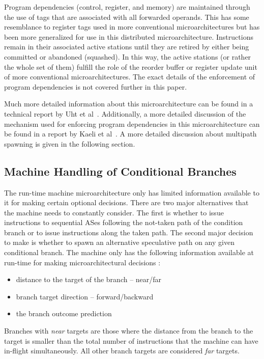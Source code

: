 \documentclass[10pt,dvips]{article}
\begin{document}
Program dependencies (control, register, and memory) are 
maintained through the use of tags that
are associated with all forwarded operands.
This has some resemblance to register tags used in more conventional 
microarchitectures but has been more generalized for use in this
distributed microarchitecture.  Instructions remain in their
associated active stations until they are retired by either being
committed or abandoned (squashed).  In this way, the active stations
(or rather the whole set of them)
fulfill the role of the reorder buffer or register update unit of more
conventional microarchitectures.
The exact details of the enforcement of program dependencies
is not covered further in this paper.

Much more detailed information about this microarchitecture
can be found in a technical report by Uht et al~\cite{Uht01}.
Additionally, a more detailed discussion of the mechanism used for
enforcing program dependencies in this microarchitecture
can be found in a report by Kaeli et al~\cite{Kaeli01}.
A more detailed discussion about multipath spawning is given
in the following section.
%
\subsection{Machine Handling of Conditional Branches}
%
The run-time machine microarchitecture only has limited information
available to it for making certain optional decisions.
There are two major alternatives that the machine needs to constantly
consider.  The first is whether to issue instructions to sequential
ASes following
the not-taken path of the condition branch or to issue instructions
along the 
taken path.  
The second major decision to make is
whether to spawn an alternative speculative path
on any given conditional branch.
The machine only has the following information
available at run-time for making microarchitectural decisions :

\begin{itemize}
\item{distance to the target of the branch -- near/far}
\item{branch target direction -- forward/backward}
\item{the branch outcome prediction}
\end{itemize}   

Branches with \textit{near} targets are those where
the distance from the branch to the target is smaller than
the total number of instructions that the machine can have
in-flight simultaneously.  All other branch targets are considered
\textit{far} targets.
\end{document}
